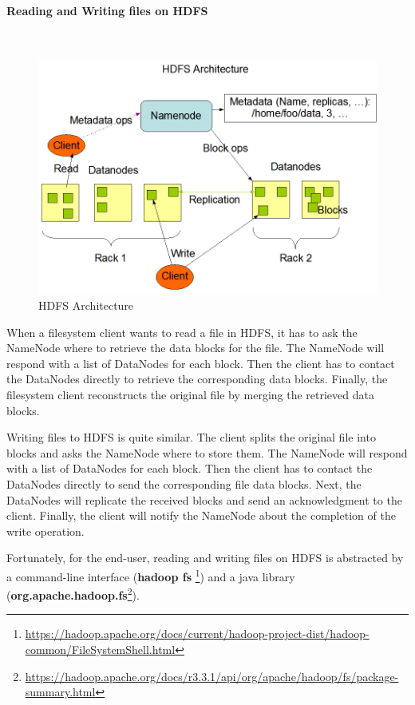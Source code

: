 \documentclass[12pt,english]{book}
\begin{document}
\paragraph{Reading and Writing files on HDFS}\mbox{}\\
 
\begin{figure}[t]
	\centering
	\includegraphics[width=\linewidth]{hdfsArch}
	\caption[HDFS Architecture]{HDFS Architecture \footnotemark}
\end{figure}

When a filesystem client wants to read a file in HDFS, it has to ask the NameNode where to retrieve the data blocks for the file.
The NameNode will respond with a list of DataNodes for each block.
Then the client has to contact the DataNodes directly to retrieve the corresponding data blocks.
Finally, the filesystem client reconstructs the original file by merging the retrieved data blocks.

Writing files to HDFS is quite similar.
The client splits the original file into blocks and asks the NameNode where to store them.
The NameNode will respond with a list of DataNodes for each block.
Then the client has to contact the DataNodes directly to send the corresponding file data blocks.
Next, the DataNodes will replicate the received blocks and send an acknowledgment to the client.
Finally, the client will notify the NameNode about the completion of the write operation.

Fortunately, for the end-user, reading and writing files on HDFS is abstracted by a command-line interface (\textbf{hadoop fs} \footnote{\url{https://hadoop.apache.org/docs/current/hadoop-project-dist/hadoop-common/FileSystemShell.html}}) and a java library (\textbf{org.apache.hadoop.fs}\footnote{\url{https://hadoop.apache.org/docs/r3.3.1/api/org/apache/hadoop/fs/package-summary.html}}).
\end{document}
